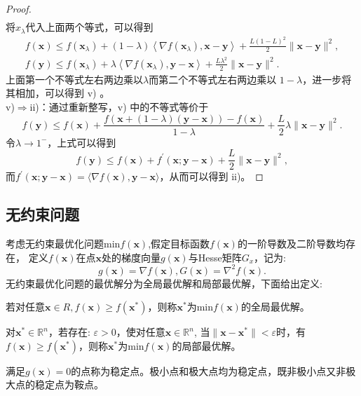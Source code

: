 \begin{proof}
\begin{equation}
\begin{array}{l}
\end{array}
    \nonumber
\end{equation}
将$x_{\lambda}  $代入上面两个等式，可以得到
\begin{equation}
\begin{array}{c}
f(\bm{x}) \leq f\left(\bm{x}_{\lambda}\right)+(1-\lambda)\left\langle\nabla f\left(\bm{x}_{\lambda}\right), \bm{x}-\bm{y}\right\rangle+\frac{L(1-L)^{2}}{2}\|\bm{x}-\bm{y}\|^{2} , \\
f(\bm{y}) \leq f\left(\bm{x}_{\lambda}\right)+\lambda\left\langle\nabla f\left(\bm{x}_{\lambda}\right), \bm{y}-\bm{x}\right\rangle+\frac{L \lambda^{2}}{2}\|\bm{x}-\bm{y}\|^{2} .
\end{array}
    \nonumber
\end{equation}
上面第一个不等式左右两边乘以$  \lambda  $而第二个不等式左右两边乘以  $1-\lambda $，进一步将其相加，可以得到 v)  。\\
v)$ \Rightarrow $ii)：通过重新整写，v) 中的不等式等价于
\begin{equation}
f(\bm{y}) \leq f(\bm{x})+\frac{f(\bm{x}+(1-\lambda)(\bm{y}-\bm{x}))-f(\bm{x})}{1-\lambda}+\frac{L}{2} \lambda\|\bm{x}-\bm{y}\|^{2} .
    \nonumber
\end{equation}
令$  \lambda \rightarrow 1^{-} $，上式可以得到
\begin{equation}
f(\bm{y}) \leq f(\bm{x})+f^{\prime}(\bm{x} ; \bm{y}-\bm{x})+\frac{L}{2}\|\bm{x}-\bm{y}\|^{2},
    \nonumber
\end{equation}
而$  f^{\prime}(\bm{x} ; \bm{y}-\bm{x})=\langle\nabla f(\bm{x}), \bm{y}-\bm{x}\rangle $，从而可以得到 ii)。
\end{proof}

\subsection{无约束问题}
考虑无约束最优化问题min$f(\bm{x})$,假定目标函数$f(\bm{x})$的一阶导数及二阶导数均存在，
定义$f(\bm{x})$在点$\bm{x}$处的梯度向量$g(\bm{x})$与Hesse矩阵$G_x$，记为:
\begin{equation}
    g(\bm{x})=\nabla f(\bm{x}), G(\bm{x})= \nabla^2f(\bm{x}) . 
    \nonumber  
\end{equation}
无约束最优化问题的最优解分为全局最优解和局部最优解，下面给出定义:
\begin{definition}[全局最优解]
    若对任意$\bm{x}\in R,f(\bm{x}) \geq f(\bm{x}^{*})$，则称$\bm{x}^{*}$为min$f(\bm{x})$的全局最优解。
\end{definition}
\begin{definition}[局部最优解]
    对$\bm{x}^*\in\mathbb{R}^{n}$，若存在: $\varepsilon >0$，使对任意$\bm{x} \in\mathbb{R}^{n}$, 
    当$\|\bm{x}-\bm{x}^*\| < \varepsilon$时，有$f(\bm{x}) ≥ f(\bm{x}^*)$，则称$\bm{x}^*$为min$f(\bm{x})$的局部最优解。
\end{definition}
\begin{definition}[稳定点]
    满足$g(\bm{x})= 0$的点称为稳定点。极小点和极大点均为稳定点，既非极小点又非极大点的稳定点为鞍点。
\end{definition}

